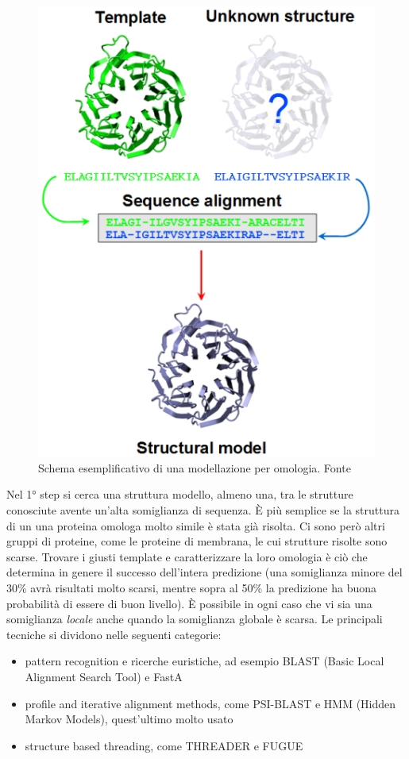 {\begin{figure}[!htb]
		\includegraphics[scale=0.5]{images/homology2.jpg}
		\caption{Schema esemplificativo di una modellazione per omologia. Fonte \cite{UNIL-homology}}
		\label{fig:omologia-esempio}
		\endminipage\hfill
	\end{figure}
	
	Nel 1° step si cerca una struttura modello, almeno una, tra le strutture conosciute avente un'alta somiglianza di sequenza. È più semplice se la struttura di un una proteina omologa molto simile è stata già risolta. Ci sono però altri gruppi di proteine, come le proteine di membrana, le cui strutture risolte sono scarse. Trovare i giusti template e caratterizzare la loro omologia è ciò che determina in genere il successo dell'intera predizione (una somiglianza minore del 30\% avrà risultati molto scarsi, mentre sopra al 50\% la predizione ha buona probabilità di essere di buon livello). È possibile in ogni caso che vi sia una somiglianza \textit{locale} anche quando la somiglianza globale è scarsa. Le principali tecniche si dividono nelle seguenti categorie:
	\begin{itemize}
		\item pattern recognition e ricerche euristiche, ad esempio BLAST (Basic Local Alignment Search Tool) e FastA
		\item profile and iterative alignment methods, come PSI-BLAST e HMM (Hidden Markov Models), quest'ultimo molto usato
		\item structure based threading, come THREADER e FUGUE
	\end{itemize}
	
}
